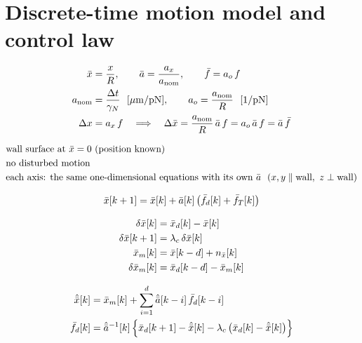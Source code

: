 \ifdefined\mcshare\else\clearpage\fi
\section{Discrete-time motion model and control law}

\[
\begin{aligned}
\bar{x} &= \frac{x}{R}, \qquad \bar{a} = \frac{a_x}{a_{\mathrm{nom}}}, \qquad \bar f = a_o\, f \\
a_{\mathrm{nom}} &= \frac{\Delta t}{\gamma_N}\ \ [\mu\mathrm{m/pN}], \qquad a_o = \frac{a_{\mathrm{nom}}}{R}\ \ [1/\mathrm{pN}] \\
\Delta x &= a_x\, f \quad\Longrightarrow\quad \Delta\bar{x} = \frac{a_{\mathrm{nom}}}{R}\,\bar{a}\, f = a_o\,\bar{a}\, f = \bar{a}\,\bar f
\end{aligned}
\]

\[
\begin{aligned}
&\text{wall surface at } \bar{x} = 0 \ \text{(position known)} \\
&\text{no disturbed motion} \\
&\text{each axis: the same one-dimensional equations with its own } \bar{a} \ \ (x, y \parallel \text{wall},\ z \perp \text{wall})
\end{aligned}
\]

\[
\bar{x}[k+1] = \bar{x}[k] + \bar{a}[k]\,\big(\bar f_d[k] + \bar f_T[k]\big)
\]

\[
\begin{aligned}
\delta\bar{x}[k] &= \bar{x}_d[k] - \bar{x}[k] \\
\delta\bar{x}[k+1] &= \lambda_c\, \delta\bar{x}[k] \\
\bar{x}_m[k] &= \bar{x}[k-d] + n_{\bar{x}}[k] \\
\delta\bar{x}_m[k] &= \bar{x}_d[k-d] - \bar{x}_m[k]
\end{aligned}
\]

\[
\begin{aligned}
\hat{\bar{x}}[k] &= \bar{x}_m[k] + \sum_{i=1}^{d} \hat{\bar{a}}[k-i]\,\bar f_d[k-i] \\
\bar f_d[k] &= \hat{\bar{a}}^{-1}[k]\,\Big\{\bar{x}_d[k+1] - \hat{\bar{x}}[k] - \lambda_c\,\big(\bar{x}_d[k] - \hat{\bar{x}}[k]\big)\Big\}
\end{aligned}
\]

